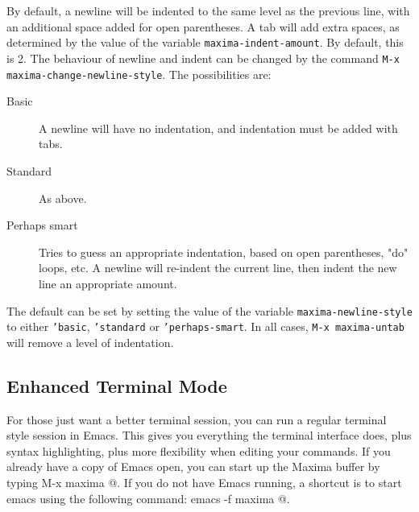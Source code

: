 By default, a newline will be indented to the same level as the 
previous line, with an additional space added for open parentheses.
A tab will add extra spaces, as determined by the value of the 
variable \texttt{maxima-indent-amount}.  By default, this is 2.
The behaviour of newline and indent can be changed by the command 
\texttt{M-x maxima-change-newline-style}.  The possibilities are:
\begin{description}
\item[Basic] A newline will have no indentation, and indentation
               must be added with tabs.
\item[Standard]      As above.
\item[Perhaps smart] Tries to guess an appropriate indentation, based on
               open parentheses, "do" loops, etc.
               A newline will re-indent the current line, then indent
               the new line an appropriate amount.
\end{description}
The default can be set by setting the value of the variable 
\texttt{maxima-newline-style} to either \texttt{'basic}, 
\texttt{'standard} or \texttt{'perhaps-smart}.
In all cases, \texttt{M-x maxima-untab} will remove a level of indentation.

\subsection{Enhanced Terminal Mode}

For those just want a better terminal session, you can run a regular terminal
style session in Emacs.  This gives you everything the 
terminal interface does, plus syntax highlighting, plus more flexibility when
editing your commands.  If you already have a copy of Emacs open, you can start
up the Maxima buffer by typing \verb@ M-x maxima @.  If you do not have Emacs
running, a shortcut is to start emacs using the following command: \verb@ emacs -f maxima @.  

